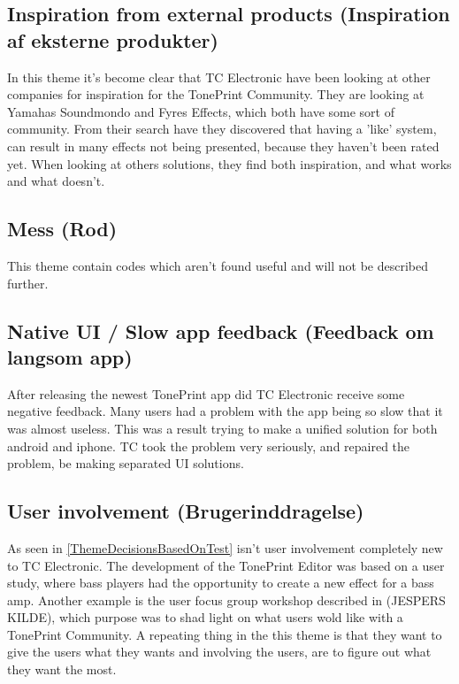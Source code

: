 \subsection*{Inspiration from external products (Inspiration af eksterne produkter)} 
\label{ThemeInspirationFromExternalProducts}
In this theme it's become clear that TC Electronic have been looking at other companies for inspiration for the TonePrint Community. They are looking at Yamahas Soundmondo and Fyres Effects, which both have some sort of community. From their search have they discovered that having a 'like' system, can result in many effects not being presented, because they haven't been rated yet. When looking at others solutions, they find both inspiration, and what works and what doesn't.

\subsection*{Mess (Rod)} 
\label{ThemeMess}
This theme contain codes which aren't found useful and will not be described further.

\subsection*{Native UI / Slow app feedback (Feedback om langsom app)}
\label{ThemeNativeUI}
After releasing the newest TonePrint app did TC Electronic receive some negative feedback. Many users had a problem with the app being so slow that it was almost useless. This was a result trying to make a unified solution for both android and iphone. TC took the problem very seriously, and repaired the problem, be making separated UI solutions. 

\subsection*{User involvement (Brugerinddragelse)} 
\label{ThemeUserInvolvement}
As seen in \autoref{ThemeDecisionsBasedOnTest} isn't user involvement completely new to TC Electronic. The development of the TonePrint Editor was based on a user study, where bass players had the opportunity to create a new effect for a bass amp. Another example is the user focus group workshop described in (JESPERS KILDE), which purpose was to shad light on what users wold like with a TonePrint Community. A repeating thing in the this theme is that they want to give the users what they wants and involving the users, are to figure out what they want the most.


